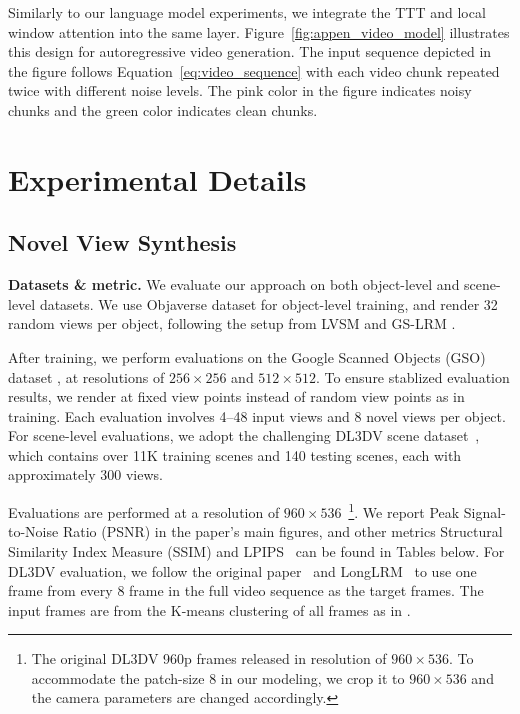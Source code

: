 \documentclass{article}
\begin{document}
Similarly to our language model experiments, we integrate the TTT and local window attention into the same layer. Figure~\ref{fig:appen_video_model} illustrates this design for autoregressive video generation. The input sequence depicted in the figure follows Equation~\ref{eq:video_sequence} with each video chunk repeated twice with different noise levels. The pink color in the figure indicates noisy chunks and the green color indicates clean chunks. 

\section{Experimental Details}
\label{sec:appen_experiment_details}

\subsection{Novel View Synthesis}
\label{sec:appen_nvs_details}

\noindent\textbf{Datasets \& metric.} We evaluate our approach on 
both object-level and scene-level datasets.
We use Objaverse dataset \cite{deitke2023objaverse} for object-level training, 
and render 32 random views per object,   
following the setup from LVSM \cite{jin2024lvsm} and GS-LRM \cite{zhang2024gs}.  

After training, we perform evaluations on the Google Scanned Objects (GSO) dataset \cite{downs2022google}, at resolutions of $256\times256$ and $512\times512$.
To ensure stablized evaluation results, we render at fixed view points instead of random view points as in training.
Each evaluation involves 4–48 input views and 8 novel views per object.
For scene-level evaluations, we adopt the challenging DL3DV scene dataset~\cite{ling2024dl3dv}, which contains over 11K training scenes and 140 testing scenes, each with approximately 300 views.

Evaluations are performed at a resolution of $960\times536$~\footnote{The original DL3DV 960p frames released in resolution of $960\times536$. To accommodate the patch-size $8$ in our modeling, we crop it to $960\times536$ and the camera parameters are changed accordingly.  }.
We report Peak Signal-to-Noise Ratio (PSNR) in the paper's main figures, and other metrics Structural Similarity Index Measure (SSIM) and LPIPS~\cite{zhang2018unreasonable} can be found in Tables below.
For DL3DV evaluation, we follow the original paper~\cite{ling2024dl3dv} and LongLRM~\cite{ziwen2024long} to use one frame from every $8$ frame in the full video sequence as the target frames.
The input frames are from the K-means clustering of all frames as in \cite{ziwen2024long}.
\end{document}
